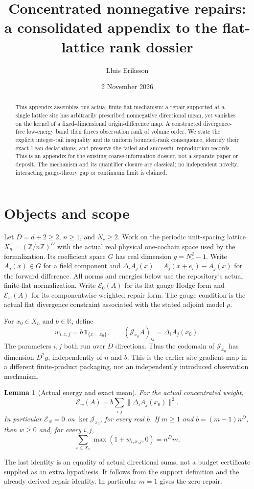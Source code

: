 \documentclass[11pt]{article}
\title{Concentrated nonnegative repairs:\\a consolidated appendix to the flat-lattice rank dossier}
\author{Lluis Eriksson}
\date{2 November 2026}
\newtheorem{lemma}{Lemma}
\newcommand{\R}{\mathbb R}
\newcommand{\E}{\mathcal E}
\newcommand{\J}{\mathcal J}
\begin{document}
\maketitle
\begin{abstract}
This appendix assembles one actual finite-flat mechanism: a repair supported
at a single lattice site has arbitrarily prescribed nonnegative directional
mean, yet vanishes on the kernel of a fixed-dimensional origin-difference
map. A constructed divergence-free low-energy band then forces observation
rank of volume order. We state the explicit integer-tail inequality and its
uniform bounded-rank consequence, identify their exact Lean declarations,
and preserve the failed and successful reproduction records. This is an
appendix for the existing coarse-information dossier, not a separate paper
or deposit. The mechanism and its quantifier closure are classical; no
independent novelty, interacting gauge-theory gap or continuum limit is claimed.
\end{abstract}

\section{Objects and scope}
Let $D=d+2\geq2$, $n\geq1$, and $N_c\geq2$. Work on the periodic unit-spacing
lattice $X_n=(\mathbb Z/n\mathbb Z)^D$ with the actual real physical
one-cochain space used by the formalization. Its coefficient space $G$ has
real dimension $g=N_c^2-1$. Write $A_j(x)\in G$ for a field component and
$\Delta_i A_j(x)=A_j(x+e_i)-A_j(x)$ for the forward difference. All norms
and energies below use the repository's actual finite-flat normalization.
Write $\E_0(A)$ for its flat gauge Hodge form and $\E_w(A)$ for its
componentwise weighted repair form. The gauge condition is the actual
flat divergence constraint associated with the stated adjoint model $\rho$.

For $x_0\in X_n$ and $b\in\R$, define
\[
 w_{i,x,j}=b\,\mathbf1_{\{x=x_0\}},\qquad
 (\J_{x_0}A)_{ij}=\Delta_i A_j(x_0).
\]
The parameters $i,j$ both run over $D$ directions. Thus the codomain of
$\J_{x_0}$ has dimension $D^2g$, independently of $n$ and $b$.
This is the earlier site-gradient map in a different finite-product
packaging, not an independently introduced observation mechanism.

\begin{lemma}[Actual energy and exact mean]
For the actual concentrated weight,
\[
 \E_w(A)=b\sum_{i,j}\|\Delta_i A_j(x_0)\|^2.
\]
In particular $\E_w=0$ on $\ker\J_{x_0}$, for every real $b$.
If $m\geq1$ and $b=(m-1)n^D$, then $w\geq0$ and, for every $i,j$,
\[
 \sum_{x\in X_n}\max(1+w_{i,x,j},0)=n^D m.
\]
\end{lemma}
The last identity is an equality of actual directional sums, not a budget
certificate supplied as an extra hypothesis. It follows from the support
definition and the already derived repair identity. In particular $m=1$
gives the zero repair.
\end{document}
